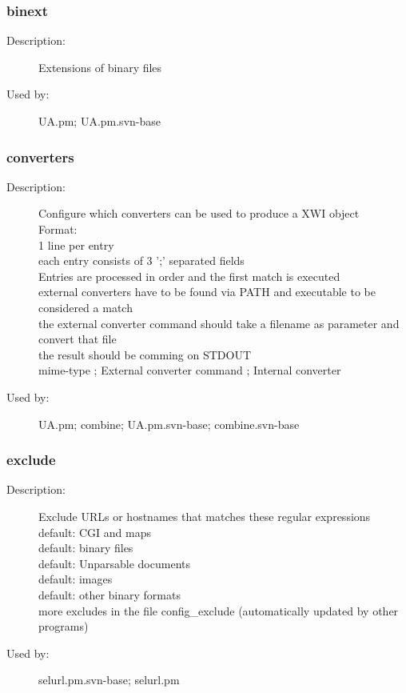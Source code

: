 \subsubsection{binext}
\label{binext}
\begin{description}
\item[Description:] Extensions of binary files
\item[Used by:] UA.pm; UA.pm.svn-base
\end{description}
\subsubsection{converters}
\label{converters}
\begin{description}
\item[Description:] Configure which converters can be used to produce a XWI object \\ Format: \\   1 line per entry \\   each entry consists of 3 ';' separated fields \\ Entries are processed in order and the first match is executed \\   external converters have to be found via PATH and executable to be considered a match \\   the external converter command should take a filename as parameter and convert that file \\    the result should be comming on STDOUT \\  mime-type   ;   External converter command ; Internal converter
\item[Used by:] UA.pm; combine; UA.pm.svn-base; combine.svn-base
\end{description}
\subsubsection{exclude}
\label{exclude}
\begin{description}
\item[Description:] Exclude URLs or hostnames that matches these regular expressions \\  default: CGI and maps \\  default: binary files \\  default: Unparsable documents \\  default: images \\  default: other binary formats \\ more excludes in the file config\_exclude (automatically updated by other programs)
\item[Used by:] selurl.pm.svn-base; selurl.pm
\end{description}
